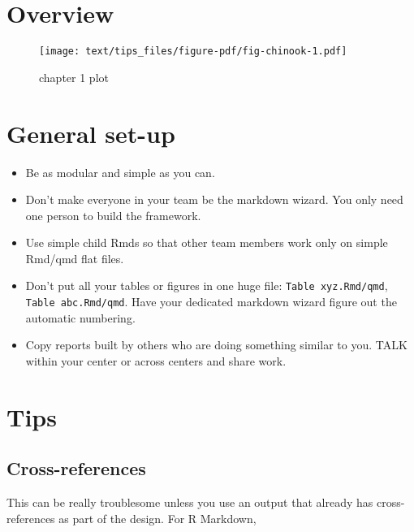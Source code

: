 \documentclass[
  letterpaper,
  oneside]{scrbook}
\begin{document}
\hypertarget{overview}{%
\section{Overview}\label{overview}}

\begin{figure}

{\centering \texttt{[image: text/tips\_files/figure-pdf/fig-chinook-1.pdf]}

}

\caption{\label{fig-chinook}chapter 1 plot}

\end{figure}

\hypertarget{general-set-up}{%
\section{General set-up}\label{general-set-up}}

\begin{itemize}
\item
  Be as modular and simple as you can.
\item
  Don't make everyone in your team be the markdown wizard. You only need
  one person to build the framework.
\item
  Use simple child Rmds so that other team members work only on simple
  Rmd/qmd flat files.
\item
  Don't put all your tables or figures in one huge file:
  \texttt{Table\ xyz.Rmd/qmd}, \texttt{Table\ abc.Rmd/qmd}. Have your
  dedicated markdown wizard figure out the automatic numbering.
\item
  Copy reports built by others who are doing something similar to you.
  TALK within your center or across centers and share work.
\end{itemize}

\hypertarget{tips-1}{%
\section{Tips}\label{tips-1}}

\hypertarget{cross-references}{%
\subsection{Cross-references}\label{cross-references}}

This can be really troublesome unless you use an output that already has
cross-references as part of the design. For R Markdown,
\end{document}
